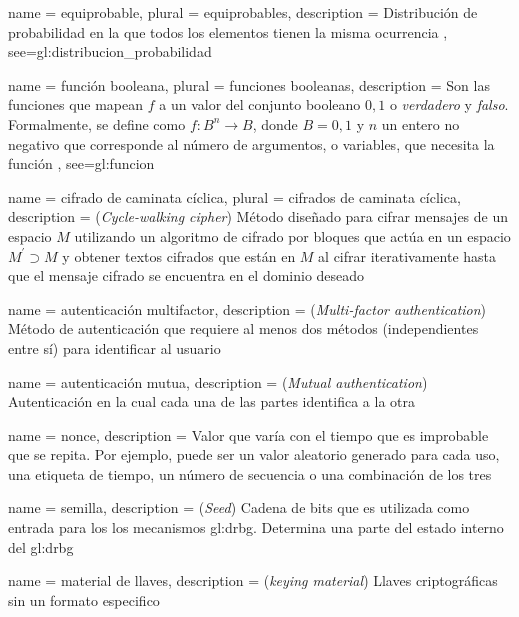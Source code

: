 {
  name = equiprobable,
  plural = equiprobables,
  description = {
    Distribución de probabilidad en la que todos los elementos tienen la misma
    ocurrencia%
  },
  see={gl:distribucion_probabilidad}
}

{
  name = función booleana,
  plural = funciones booleanas,
  description = {
    Son las funciones que mapean $f$ a un valor del conjunto booleano ${0,1}$ o
    \textit{verdadero} y \textit{falso}.
    Formalmente, se define como $f: B^n \rightarrow B$, donde $B={0,1}$
    y $n$ un entero no negativo que corresponde al número de argumentos,
    o variables, que necesita la función%
  },
  see={gl:funcion}
}

{
  name = cifrado de caminata cíclica,
  plural = cifrados de caminata cíclica,
  description = {
    (\textit{Cycle-walking cipher}) Método diseñado para cifrar mensajes de un
    espacio $M$ utilizando un algoritmo de cifrado por bloques que actúa en un
    espacio $M^\prime \supset M$ y obtener textos cifrados que están en $M$ al
    cifrar iterativamente hasta que el mensaje cifrado se encuentra en el
    dominio deseado%
  }
}

{
  name = autenticación multifactor,
  description = {
    (\textit{Multi-factor authentication}) Método de autenticación que requiere
    al menos dos métodos (independientes entre sí) para identificar al usuario%
  }
}

{
  name = autenticación mutua,
  description = {
    (\textit{Mutual authentication}) Autenticación en la cual cada una de
    las partes identifica a la otra%
  }
}

{
  name = nonce,
  description = {
    Valor que varía con el tiempo que es improbable que se repita. Por ejemplo,
    puede ser un valor aleatorio generado para cada uso, una etiqueta de tiempo,
    un número de secuencia o una combinación de los tres%
  }
}

{
  name = semilla,
  description = {
    (\textit{Seed}) Cadena de bits que es utilizada como entrada para los
    los mecanismos \gls{gl:drbg}. Determina una parte del estado interno
    del \gls{gl:drbg}%
  }
}

{
  name = material de llaves,
  description = {(\textit{keying material})
    Llaves criptográficas sin un formato especifico%
  }
}

\glsaddall
